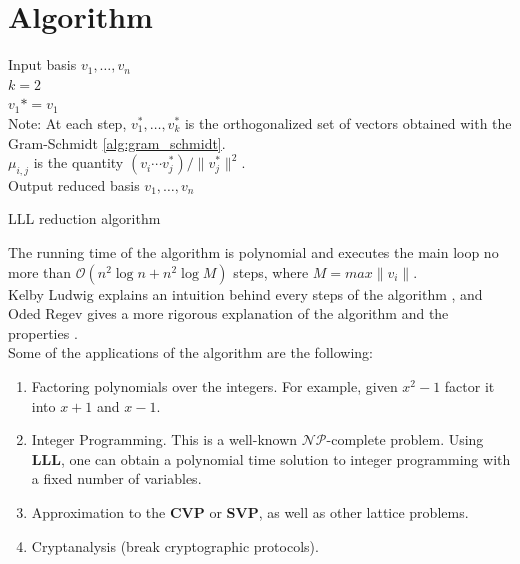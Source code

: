 \documentclass[a4paper,12pt]{report}
\begin{document}
\section{Algorithm}

\begin{algorithm}[H]
    \vspace*{5px}
    Input basis ${v_1, \ldots, v_n}$ \; \\
    $k = 2$ \; \\
    $v_1* = v_1$ \; \\
    Note: At each step, $v_1^*, \ldots, v_k^*$ is the orthogonalized set of vectors
    obtained with the Gram-Schmidt \ref{alg:gram_schmidt}. \\
    \vspace*{5px}
    $\mu_{i,j}$ is the quantity $(v_i \cdots v_j^*) / \lVert v_j^* \rVert^2$. \\
    Output reduced basis ${v_1, \ldots, v_n}$
    \caption{LLL reduction algorithm}
\end{algorithm}

The running time of the algorithm is polynomial and executes the main loop no more than
$\mathcal{O}(n^2\log n + n^2\log M)$ steps, where $M = max \lVert v_i \rVert$. \\

Kelby Ludwig explains an intuition behind every steps of the algorithm \cite{lllintuition}, and Oded Regev
gives a more rigorous explanation of the algorithm and the properties \cite{lllexplanation}.\\

Some of the applications of the algorithm are the following:

\begin{enumerate}
    \item Factoring polynomials over the integers. For example, given $x^2 - 1$ factor it into $x + 1$ and $x - 1$.
    \item Integer Programming. This is a well-known $\mathcal{NP}$-complete problem. Using \textbf{LLL}, one can obtain a polynomial time solution
          to integer programming with a fixed number of variables.
    \item Approximation to the \textbf{CVP} or \textbf{SVP}, as well as other lattice problems.
    \item Cryptanalysis (break cryptographic protocols).
\end{enumerate}
\end{document}
